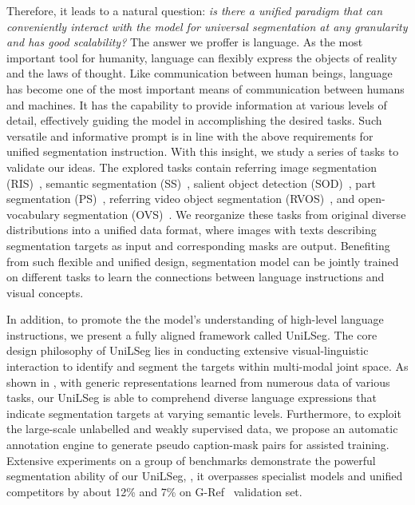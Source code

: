 \documentclass[10pt,twocolumn,letterpaper]{article}
\newcommand{\MethodName}{UniLSeg\xspace}
\begin{document}
Therefore, it leads to a natural question: \textit{is there a unified paradigm that can conveniently interact with the model for universal segmentation at any granularity and has good scalability?} 
The answer we proffer is language. As the most important tool for humanity, language can flexibly express the objects of reality and the laws of thought. 
Like communication between human beings, language has become one of the most important means of communication between humans and machines. It has the capability to provide information at various levels of detail, effectively guiding the model in accomplishing the desired tasks. Such versatile and informative prompt is in line with the above requirements for unified segmentation instruction.
With this insight, we study a series of tasks to validate our ideas. The explored tasks contain referring image segmentation (RIS)~\cite{lavt, cris}, semantic segmentation (SS)~\cite{fcn, mask2former}, salient object detection (SOD)~\cite{sod1, sod2}, part segmentation (PS)~\cite{semanticsam, partimagenet}, referring video object segmentation (RVOS)~\cite{soc, urvos}, and open-vocabulary segmentation (OVS)~\cite{gkc, Simbaseline}. We reorganize these tasks from original diverse distributions into a unified data format, where images with texts describing segmentation targets as input and corresponding masks are output. Benefiting from such flexible and unified design, segmentation model can be jointly trained on different tasks to learn the connections between language instructions and visual concepts. 

In addition, to promote the the model's understanding of high-level language instructions, we present a fully aligned framework called \MethodName. The core design philosophy of \MethodName lies in conducting extensive visual-linguistic interaction to identify and segment the targets within multi-modal joint space.
As shown in , with generic representations learned from numerous data of various tasks, our \MethodName  is able to comprehend diverse language expressions that indicate segmentation targets at varying semantic levels.
Furthermore, to exploit the large-scale unlabelled and weakly supervised data, we propose an automatic annotation engine to generate pseudo caption-mask pairs for assisted training. 
Extensive experiments on a group of benchmarks demonstrate the powerful  segmentation ability of our \MethodName, \eg, it overpasses specialist models and unified competitors by about 12\% and 7\% on G-Ref~\cite{grefcoco} validation set.
\end{document}
